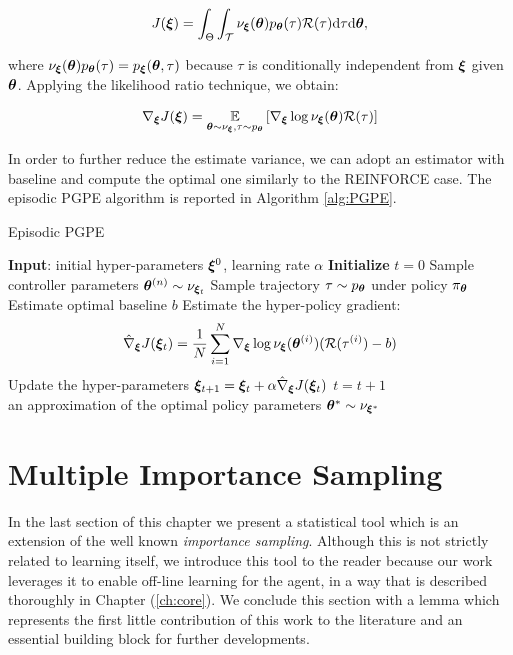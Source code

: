 \begin{align}
J(\boldsymbol{\xi}) = \int_{\Theta}\int_{\mathcal{T}}\nu_{\boldsymbol{\xi}}(\boldsymbol{\theta})p_{\boldsymbol{\theta}}(\tau)\mathcal{R}(\tau)\mathrm{d}\tau \mathrm{d}\boldsymbol{\theta}, 
\end{align}

where $\nu_{\boldsymbol{\xi}}(\boldsymbol{\theta})p_{\boldsymbol{\theta}}(\tau)=p_{\boldsymbol{\xi}}(\boldsymbol{\theta},\tau)$ because $\tau$ is conditionally independent from $\boldsymbol{\xi}$ given $\boldsymbol{\theta}$. Applying the likelihood ratio technique, we obtain:

\begin{align}
\nabla_{\boldsymbol{\xi}}J(\boldsymbol{\xi}) = \underset{\boldsymbol{\theta}\sim\nu_{\boldsymbol{\xi}}, \tau\sim p_{\boldsymbol{\theta}}}{\mathbb{E}}\left[{\nabla_{\boldsymbol{\xi}}\log\nu_{\boldsymbol{\xi}}(\boldsymbol{\theta})\mathcal{R}(\tau)}\right] 
\end{align}

In order to further reduce the estimate variance, we can adopt an estimator with baseline and compute the optimal one similarly to the REINFORCE case. The episodic \gls{PGPE} algorithm is reported in Algorithm \ref{alg:PGPE}.

\begin{algorithm}[t]
	\caption{Episodic \gls{PGPE}}
	\label{alg:PGPE}
	\begin{algorithmic}[1]
	\State \textbf{Input}: initial hyper-parameters $\boldsymbol{\xi}^{0}$, learning rate $\alpha$
	\State \textbf{Initialize} $t=0$
			\State Sample controller parameters $\boldsymbol{\theta}^{(n)} \sim\nu_{\boldsymbol{\xi}_t}$
			\State Sample trajectory $\tau\sim p_{\boldsymbol{\theta}}$ under policy $\pi_{\boldsymbol{\theta}}$
		\EndFor 
		\State Estimate optimal baseline $b$
		\State Estimate the hyper-policy gradient:
		\begin{align*}
		\hat{\nabla}_{\boldsymbol{\xi}}J(\boldsymbol{\xi}_t) = \frac{1}{N}\sum_{i=1}^{N}\nabla_{\boldsymbol{\xi}}\log \nu_{\boldsymbol{\xi}}(\boldsymbol{\theta}^{(i)})(\mathcal{R}(\tau^{(i)}) - b)
		\end{align*}
		\State Update the hyper-parameters $\boldsymbol{\xi}_{t+1} = \boldsymbol{\xi}_{t}+\alpha\hat{\nabla}_{\boldsymbol{\xi}}J(\boldsymbol{\xi}_t)$
		\State $t = t + 1$
	\EndWhile \\
	\Return an approximation of the optimal policy parameters $\boldsymbol{\theta}^* \sim \nu_{\boldsymbol{\xi}^*}$
	\end{algorithmic}
\end{algorithm}

\section{Multiple Importance Sampling} \label{sec:mis}
In the last section of this chapter we present a statistical tool which is an extension of the well known \emph{importance sampling}. Although this is not strictly related to learning itself, we introduce this tool to the reader because our work leverages it to enable off-line learning for the agent, in a way that is described thoroughly in Chapter (\ref{ch:core}).
We conclude this section with a lemma which represents the first little contribution of this work to the literature and an essential building block for further developments.

